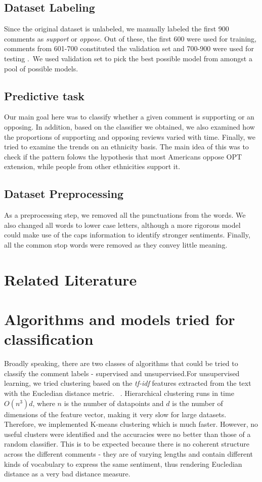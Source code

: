 \documentclass{sig-alternate-05-2015}
\begin{document}
\subsection{Dataset Labeling}
Since the original dataset is unlabeled, we manually labeled the first 900 comments as \textit{support} or \textit{oppose}. Out of these, the first 600 were used for training, comments from 601-700 constituted the validation set and 700-900 were used for testing .\ 
We used validation set to pick the best possible model from amongst a pool of possible models. 
\subsection{Predictive task}
Our main goal here was to classify whether a given comment is  supporting or an opposing. In addition, based on the classifier we obtained, we also examined how the proportions of supporting and opposing reviews varied with time. Finally, we tried to examine the trends on an ethnicity basis. The main idea of this was to check if the pattern folows the hypothesis that most Americans oppose OPT extension, while people from other ethnicities support it.
\subsection{Dataset Preprocessing}
As a preprocessing step, we removed all the punctuations from the words. We also changed all words to lower case letters, although a more rigorous model could make use of the caps information to identify stronger sentiments. Finally, all the common stop words were removed as they convey little meaning. 
\section{Related Literature}

\section{Algorithms and models tried for classification}
Broadly speaking, there are two classes of algorithms that could be tried to classify the comment labels - supervised and unsupervised.For unsupervised learning, we tried clustering based on the \textit{tf-idf} features extracted from the text with the Eucledian distance metric. \
. Hierarchical clustering runs in time $O (n^3)d$, where $n$ is the number of datapoints and $d$ is the number of dimensions of the feature vector, making it very slow for large datasets. Therefore,  we implemented K-means clustering which is much faster. However, no useful clusters were identified and the accuracies were no better than those of a random classifier. This is to be expected because there is no coherent structure across the different comments - they are of varying lengths and contain different kinds of vocabulary to express the same sentiment, thus rendering Eucledian distance as a very bad distance measure.
\end{document}
